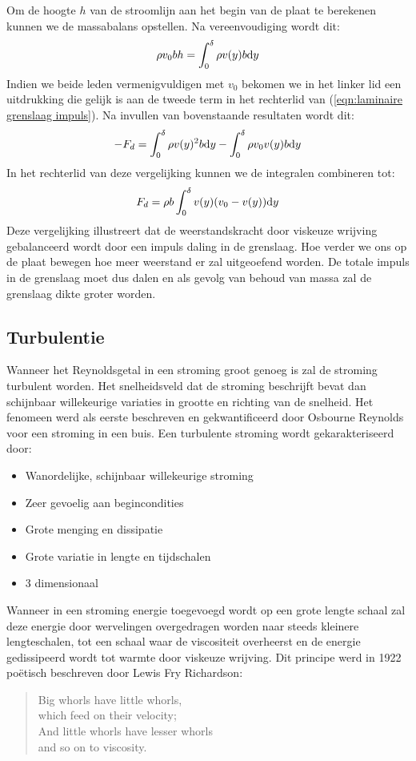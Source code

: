 Om de hoogte $h$ van de stroomlijn aan het begin van de plaat te berekenen kunnen we de massabalans opstellen. Na vereenvoudiging wordt dit:
\begin{equation}
	\rho v_0 b h = \int_0^{\delta} \rho v(y) b \mathrm{d} y
\end{equation}
Indien we beide leden vermenigvuldigen met $v_0$ bekomen we in het linker lid een uitdrukking die gelijk is aan de tweede term in het rechterlid van (\ref{eqn:laminaire grenslaag impuls}). Na invullen van bovenstaande resultaten wordt dit:
\begin{equation}
	-F_d = \int_0^{\delta} \rho v(y)^2 b \mathrm{d} y  - \int_0^{\delta} \rho v_0 v(y) b \mathrm{d} y
\end{equation}
In het rechterlid van deze vergelijking kunnen we de integralen combineren tot:
\begin{equation}
	F_d = \rho b \int_0^{\delta} v(y)(v_0-v(y))\mathrm{d} y
\end{equation}
Deze vergelijking illustreert dat de weerstandskracht door viskeuze wrijving gebalanceerd wordt door een impuls daling in de grenslaag. Hoe verder we ons op de plaat bewegen hoe meer weerstand er zal uitgeoefend worden. De totale impuls in de grenslaag moet dus dalen en als gevolg van behoud van massa zal de grenslaag dikte groter worden.

		\subsection{Turbulentie}
Wanneer het Reynoldsgetal in een stroming groot genoeg is zal de stroming turbulent worden. Het snelheidsveld dat de stroming beschrijft bevat dan schijnbaar willekeurige variaties in grootte en richting van de snelheid. Het fenomeen werd als eerste beschreven en gekwantificeerd door Osbourne Reynolds voor een stroming in een buis. Een turbulente stroming wordt gekarakteriseerd door:
\begin{itemize}
	\item Wanordelijke, schijnbaar willekeurige stroming
	\item Zeer gevoelig aan begincondities
	\item Grote menging en dissipatie
	\item Grote variatie in lengte en tijdschalen
	\item 3 dimensionaal
\end{itemize}

Wanneer in een stroming energie toegevoegd wordt op een grote lengte schaal zal deze energie door wervelingen overgedragen worden naar steeds kleinere lengteschalen, tot een schaal waar de viscositeit overheerst en de energie gedissipeerd wordt tot warmte door viskeuze wrijving. Dit principe werd in 1922 poëtisch beschreven door Lewis Fry Richardson:
\begin{quotation}
Big whorls have little whorls,\\
which feed on their velocity;\\
And little whorls have lesser whorls\\
and so on to viscosity.\\
\end{quotation}

